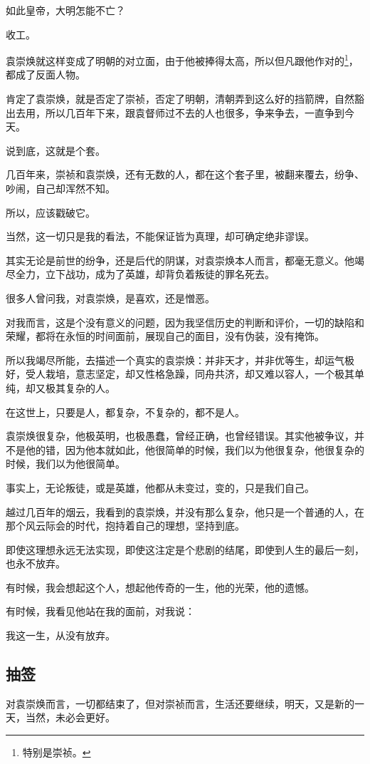 \begin{multicols}{\theparacolNo}
如此皇帝，大明怎能不亡？

收工。

袁崇焕就这样变成了明朝的对立面，由于他被捧得太高，所以但凡跟他作对的\footnote{特别是崇祯。}，都成了反面人物。

肯定了袁崇焕，就是否定了崇祯，否定了明朝，清朝弄到这么好的挡箭牌，自然豁出去用，所以几百年下来，跟袁督师过不去的人也很多，争来争去，一直争到今天。

说到底，这就是个套。

几百年来，崇祯和袁崇焕，还有无数的人，都在这个套子里，被翻来覆去，纷争、吵闹，自己却浑然不知。

所以，应该戳破它。

当然，这一切只是我的看法，不能保证皆为真理，却可确定绝非谬误。

其实无论是前世的纷争，还是后代的阴谋，对袁崇焕本人而言，都毫无意义。他竭尽全力，立下战功，成为了英雄，却背负着叛徒的罪名死去。

很多人曾问我，对袁崇焕，是喜欢，还是憎恶。

对我而言，这是个没有意义的问题，因为我坚信历史的判断和评价，一切的缺陷和荣耀，都将在永恒的时间面前，展现自己的面目，没有伪装，没有掩饰。

所以我竭尽所能，去描述一个真实的袁崇焕：并非天才，并非优等生，却运气极好，受人栽培，意志坚定，却又性格急躁，同舟共济，却又难以容人，一个极其单纯，却又极其复杂的人。

在这世上，只要是人，都复杂，不复杂的，都不是人。

袁崇焕很复杂，他极英明，也极愚蠢，曾经正确，也曾经错误。其实他被争议，并不是他的错，因为他本就如此，他很简单的时候，我们以为他很复杂，他很复杂的时候，我们以为他很简单。

事实上，无论叛徒，或是英雄，他都从未变过，变的，只是我们自己。

越过几百年的烟云，我看到的袁崇焕，并没有那么复杂，他只是一个普通的人，在那个风云际会的时代，抱持着自己的理想，坚持到底。

即使这理想永远无法实现，即使这注定是个悲剧的结尾，即使到人生的最后一刻，也永不放弃。

有时候，我会想起这个人，想起他传奇的一生，他的光荣，他的遗憾。

有时候，我看见他站在我的面前，对我说：

我这一生，从没有放弃。

\subsection{抽签}
对袁崇焕而言，一切都结束了，但对崇祯而言，生活还要继续，明天，又是新的一天，当然，未必会更好。


\end{multicols}
